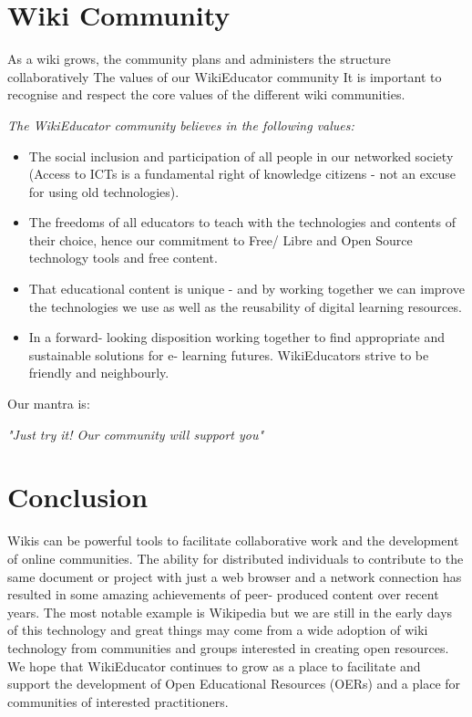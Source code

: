 \documentclass[12pt,a4paper]{report}
\begin{document}
	\section{Wiki Community}
	As a wiki grows, the community plans and administers the structure collaboratively
	The values of our WikiEducator community 
	It is important to recognise and respect the core values of the different wiki communities.

	\itshape	The WikiEducator \normalfont 	community believes in the following values:
\begin{itemize}
	\item	The social inclusion and participation of all people in our networked society (Access to 	ICTs is a fundamental right of knowledge citizens - not an excuse for using old 	technologies).
	\item	The freedoms of all educators to teach with the technologies and contents of their choice, hence our commitment to Free/ Libre and Open Source technology tools and free content.
	\item	That educational content is unique - and by working together we can improve the technologies we use as well as the reusability of digital learning resources.
	\item	In a forward- looking disposition working together to find appropriate and sustainable 	solutions for e- learning futures. 	WikiEducators strive to be friendly and neighbourly. 
\end{itemize}		
	Our mantra is: 
\begin{displayquote}
	\textit{
		"Just try it! Our community will support you" 
	}
\end{displayquote}
	
	\section{Conclusion}
	Wikis can be powerful tools to facilitate collaborative work and the development of online communities. The ability for distributed individuals to contribute to the same document or project with just a web browser and a network connection has resulted in some amazing achievements of peer- produced content over recent years. The most notable example is 	Wikipedia but we are still in the early days of this technology and great things may come from a wide adoption of wiki technology from communities and groups interested in creating open resources. We hope that WikiEducator continues to grow as a place to facilitate and support the development of Open Educational Resources (OERs) and a place for communities of interested practitioners.
\end{document}
